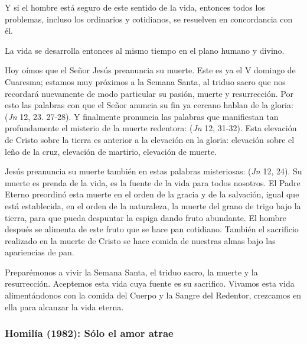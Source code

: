 \begin{body}
Y si el hombre está seguro de este sentido de la vida, entonces todos los problemas, incluso los ordinarios y cotidianos, se resuelven en concordancia con él.

La vida se desarrolla entonces al mismo tiempo en el plano humano y divino.

Hoy oímos que el Señor Jesús preanuncia su muerte. Este es ya el V domingo de Cuaresma; estamos muy próximos a la Semana Santa, al triduo sacro que nos recordará nuevamente de modo particular su pasión, muerte y resurrección. Por esto las palabras con que el Señor anuncia su fin ya cercano hablan de la gloria:  (\textit{Jn} 12, 23. 27-28). Y finalmente pronuncia las palabras que manifiestan tan profundamente el misterio de la muerte redentora:  (\textit{Jn} 12, 31-32). Esta elevación de Cristo sobre la tierra es anterior a la elevación en la gloria: elevación sobre el leño de la cruz, elevación de martirio, elevación de muerte.

Jesús preanuncia su muerte también en estas palabras misteriosas:  (\textit{Jn} 12, 24). Su muerte es prenda de la vida, es la fuente de la vida para todos nosotros. El Padre Eterno preordinó esta muerte en el orden de la gracia y de la salvación, igual que está establecida, en el orden de la naturaleza, la muerte del grano de trigo bajo la tierra, para que pueda despuntar la espiga dando fruto abundante. El hombre después se alimenta de este fruto que se hace pan cotidiano. También el sacrificio realizado en la muerte de Cristo se hace comida de nuestras almas bajo las apariencias de pan.

Preparémonos a vivir la Semana Santa, el triduo sacro, la muerte y la resurrección. Aceptemos esta vida cuya fuente es su sacrifico. Vivamos esta vida alimentándonos con la comida del Cuerpo y la Sangre del Redentor, crezcamos en ella para alcanzar la vida eterna.
\end{body}

\label{b2-03-05-1982A}
\newpage

\subsubsection{Homilía (1982): Sólo el amor atrae}

